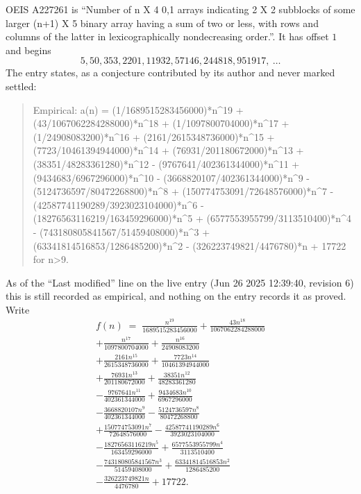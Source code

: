 \documentclass[11pt,a4paper]{article}
\theoremstyle{plain}
\theoremstyle{definition}
\begin{document}
OEIS A227261 is ``Number of n X 4 0,1 arrays indicating 2 X 2 subblocks of some larger (n+1) X 5 binary array having a sum of two or less, with rows and columns of the latter in lexicographically nondecreasing order.''. It has offset $1$ and begins
\[
5, 50, 353, 2201, 11932, 57146, 244818, 951917,\ \dots
\]
The entry states, as a conjecture contributed by its author and never marked settled:
\begin{quote}\raggedright\small
Empirical: a(n) = (1/1689515283456000)*n\^{}19 + (43/1067062284288000)*n\^{}18 + (1/1097800704000)*n\^{}17 + (1/24908083200)*n\^{}16 + (2161/2615348736000)*n\^{}15 + (7723/10461394944000)*n\^{}14 + (76931/201180672000)*n\^{}13 + (38351/48283361280)*n\^{}12 - (9767641/402361344000)*n\^{}11 + (9434683/6967296000)*n\^{}10 - (3668820107/402361344000)*n\^{}9 - (5124736597/80472268800)*n\^{}8 + (150774753091/72648576000)*n\^{}7 - (42587741190289/3923023104000)*n\^{}6 - (18276563116219/163459296000)*n\^{}5 + (6577553955799/3113510400)*n\^{}4 - (743180805841567/51459408000)*n\^{}3 + (63341814516853/1286485200)*n\^{}2 - (326223749821/4476780)*n + 17722 for n>9.
\end{quote}
As of the ``Last modified'' line on the live entry (Jun 26 2025 12:39:40, revision 6) this is still
recorded as empirical, and nothing on the entry records it as proved. Write
\begin{multline*}
f(n)\;=\;\frac{n^{19}}{1689515283456000} + \frac{43 n^{18}}{1067062284288000} \\
+ \frac{n^{17}}{1097800704000} + \frac{n^{16}}{24908083200} \\
+ \frac{2161 n^{15}}{2615348736000} + \frac{7723 n^{14}}{10461394944000} \\
+ \frac{76931 n^{13}}{201180672000} + \frac{38351 n^{12}}{48283361280} \\
- \frac{9767641 n^{11}}{402361344000} + \frac{9434683 n^{10}}{6967296000} \\
- \frac{3668820107 n^{9}}{402361344000} - \frac{5124736597 n^{8}}{80472268800} \\
+ \frac{150774753091 n^{7}}{72648576000} - \frac{42587741190289 n^{6}}{3923023104000} \\
- \frac{18276563116219 n^{5}}{163459296000} + \frac{6577553955799 n^{4}}{3113510400} \\
- \frac{743180805841567 n^{3}}{51459408000} + \frac{63341814516853 n^{2}}{1286485200} \\
- \frac{326223749821 n}{4476780} + 17722.
\end{multline*}
\end{document}
